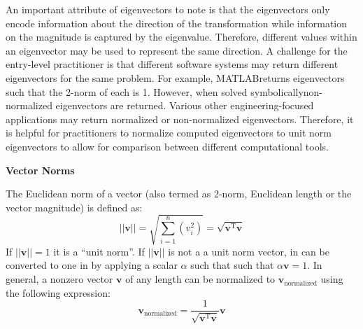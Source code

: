 \documentclass[12pt,letter]{article}
\begin{document}
	An important attribute of eigenvectors to note is that the eigenvectors only encode information about the direction of the transformation while information on the magnitude is captured by the eigenvalue. Therefore, different values within an eigenvector may be used to represent the same direction.  A challenge for the entry-level practitioner is that different software systems may return different eigenvectors for the same problem. For example, MATLAB\protect\footnotemark[1] returns eigenvectors such that the 2-norm of each is 1. However, when solved symbolically\protect\footnotemark[2] non-normalized eigenvectors are returned. Various other engineering-focused applications may return normalized or non-normalized eigenvectors\protect\footnotemark[3]. Therefore, it is helpful for practitioners to normalize computed eigenvectors to unit norm eigenvectors to allow for comparison between different computational tools. 
	

	
	
		\begin{review}	
		\textbf{Vector Norms} 
		
	\noindent The Euclidean norm of a vector (also termed as 2-norm, Euclidean length or the vector magnitude) is defined as:
	\begin{equation}
	||\textbf{v}|| = \sqrt{\sum_{i=1}^{n}(v_i^2)} = \sqrt{\textbf{v}^{\text{T}}\textbf{v}}
	\end{equation} 
	If $||\textbf{v}|| = 1$ it is a ``unit norm''. If $||\textbf{v}||$ is not a a unit norm vector, in can be converted to one in by applying a scalar $\alpha$ such that such that $\alpha\textbf{v}=1$. In general, a nonzero vector $\textbf{v}$ of any length can be normalized to $\textbf{v}_\text{normalized}$ using the following expression:
		\begin{equation}
		\textbf{v}_\text{normalized} = \frac{1}{\sqrt{\textbf{v}^{\text{T}}\textbf{v}} } \textbf{v}
		\end{equation}
	\end{review}	

	
	
	 
	
\end{document}
